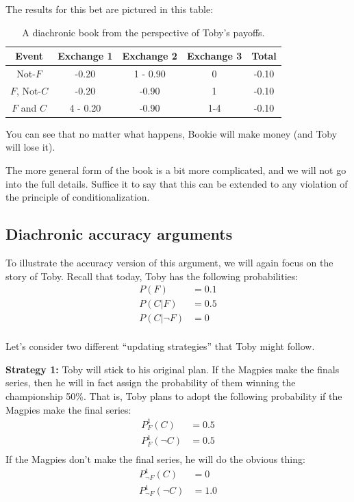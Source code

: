 The results for this bet are pictured in this table:
\begin{table}[h!]
\centering
\begin{tabular}{ccccc}
\toprule
Event             & Exchange 1 & Exchange 2  & Exchange 3 & Total \\
\midrule
Not-$F$           & -0.20       & 1 - 0.90   & 0          & -0.10 \\
$F$, Not-$C$      & -0.20       & -0.90        & 1         & -0.10 \\
$F$ and $C$       & 4 - 0.20  & -0.90        & 1-4      & -0.10\\
\bottomrule
\end{tabular}
\medskip
\caption{A diachronic book from the perspective of Toby's payoffs.}
\end{table}

You can see that no matter what happens, Bookie will make money (and Toby will lose it).  

The more general form of the book is a bit more complicated, and we will not go into the full details. Suffice it to say that this can be extended to any violation of the principle of conditionalization.

\subsection{Diachronic accuracy arguments}

To illustrate the accuracy version of this argument, we will again focus on the story of Toby.  Recall that today, Toby has the following probabilities:
\begin{align*}
    P(F) & = 0.1\\
    P(C|F) & = 0.5\\
    P(C|\neg F) & = 0 \\
\end{align*}

Let's consider two different ``updating strategies'' that Toby might follow.

{\bf Strategy 1:} Toby will stick to his original plan.  If the Magpies make the finals series, then he will in fact assign the probability of them winning the championship 50\%.  That is, Toby plans to adopt the following probability if the Magpies make the final series:
\begin{align*}
    P_F^1(C) & = 0.5\\
    P_F^1(\neg C) & = 0.5\\
\end{align*}
If the Magpies don't make the final series, he will do the obvious thing:
\begin{align*}
    P_{\neg F}^1(C) & = 0\\
    P_{\neg F}^1(\neg C) & = 1.0\\
\end{align*}

